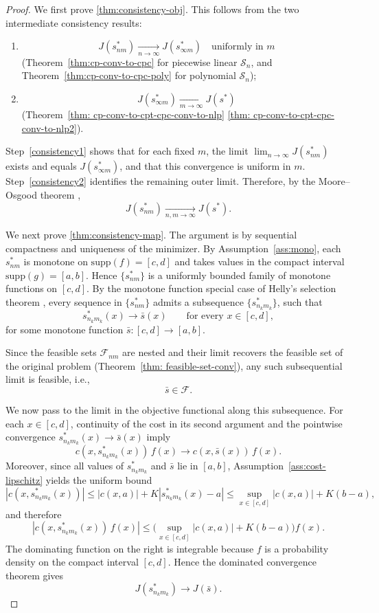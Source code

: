 \documentclass[12pt,leqno]{amsart}
\begin{document}
\begin{proof}
We first prove \ref{thm:consistency-obj}. This follows from the two
intermediate consistency results:
\begin{enumerate}[label={(\arabic*)},itemindent=1em]
    \item\label{consistency1}
    \[
    J(s_{nm}^*) \xrightarrow[n\to\infty]{} J(s_{\infty m}^*)
    \quad\text{uniformly in } m
    \]
    (Theorem~\ref{thm:cp-conv-to-cpc} for piecewise linear
    $\mathcal S_n$, and
    Theorem~\ref{thm:cp-conv-to-cpc-poly} for polynomial
    $\mathcal S_n$);
    \item\label{consistency2}
    \[
    J(s_{\infty m}^*) \xrightarrow[m\to\infty]{} J(s^*)
    \]
    (Theorem~\ref{thm: cp-conv-to-cpt-cpc-conv-to-nlp}%
    \ref{thm: cp-conv-to-cpt-cpc-conv-to-nlp2}).
\end{enumerate}
Step~\ref{consistency1} shows that for each fixed $m$, the limit
$\lim_{n\to\infty}J(s_{nm}^*)$ exists and equals $J(s_{\infty m}^*)$,
and that this convergence is uniform in $m$. Step~\ref{consistency2}
identifies the remaining outer limit. Therefore, by the
Moore--Osgood theorem \citep[Theorem~7.11]{rudin1976principles},
\[
J(s_{nm}^*) \xrightarrow[n,m\to\infty]{} J(s^*).
\]

We next prove \ref{thm:consistency-map}. The argument is by sequential compactness and uniqueness of the minimizer.
By Assumption~\ref{ass:mono}, each $s_{nm}^*$ is monotone on
$\mathrm{supp}(f)=[c,d]$ and takes values in the compact interval
$\mathrm{supp}(g)=[a,b]$. Hence $\{s_{nm}^*\}$ is a uniformly bounded
family of monotone functions on $[c,d]$. By the monotone function
special case of Helly's selection theorem
\citep[Chapter~10, Theorem~5]{kolmogorov1970intro}, every sequence in $\{s_{nm}^*\}$
admits a subsequence $\{s_{n_km_k}^*\}$, such that
\[
s_{n_km_k}^*(x)\to \bar s(x)
\qquad\text{for every }x\in[c,d],
\]
for some monotone function $\bar s:[c,d]\to[a,b]$.

Since the feasible sets $\mathcal F_{nm}$ are nested and their limit
recovers the feasible set of the original problem
(Theorem~\ref{thm: feasible-set-conv}), any such subsequential limit is
feasible, i.e.,
\[
\bar s\in\mathcal F.
\]

We now pass to the limit in the objective functional along this
subsequence. For each $x\in[c,d]$, continuity of the cost in its second
argument and the pointwise convergence
$s_{n_km_k}^*(x)\to \bar s(x)$ imply
\[
c(x,s_{n_km_k}^*(x))\,f(x)\to c(x,\bar s(x))\,f(x).
\]
Moreover, since all values of $s_{n_km_k}^*$ and $\bar s$ lie in
$[a,b]$, Assumption~\ref{ass:cost-lipschitz} yields the uniform bound
\[
|c(x,s_{n_km_k}^*(x))|
\le |c(x,a)| + K|s_{n_km_k}^*(x)-a|
\le \sup_{x\in[c,d]}|c(x,a)| + K(b-a),
\]
and therefore
\[
|c(x,s_{n_km_k}^*(x))\,f(x)|
\le \Big(\sup_{x\in[c,d]}|c(x,a)| + K(b-a)\Big) f(x).
\]
The dominating function on the right is integrable because
$f$ is a probability density on the compact interval $[c,d]$.
Hence the dominated convergence theorem gives
\[
J(s_{n_km_k}^*) \to J(\bar s).
\]


\end{proof}
\end{document}

